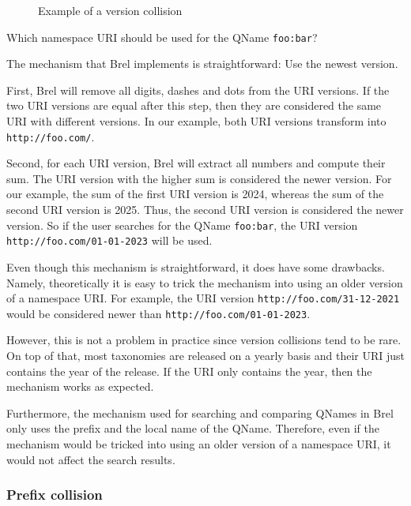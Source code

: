 \begin{figure}[H]
    \caption{Example of a version collision}
    \label{fig:version_collision_example}
\end{figure}

Which namespace URI should be used for the QName \texttt{foo:bar}?

The mechanism that Brel implements is straightforward: Use the newest version.

First, Brel will remove all digits, dashes and dots from the URI versions. 
If the two URI versions are equal after this step, then they are considered the same URI with different versions.
In our example, both URI versions transform into \texttt{http://foo.com/}.

Second, for each URI version, Brel will extract all numbers and compute their sum. The URI version with the higher sum is considered the newer version.
For our example, the sum of the first URI version is 2024, whereas the sum of the second URI version is 2025. 
Thus, the second URI version is considered the newer version. 
So if the user searches for the QName \texttt{foo:bar}, the URI version \texttt{http://foo.com/01-01-2023} will be used.

Even though this mechanism is straightforward, it does have some drawbacks. 
Namely, theoretically it is easy to trick the mechanism into using an older version of a namespace URI.
For example, the URI version \texttt{http://foo.com/31-12-2021} would be considered newer than \texttt{http://foo.com/01-01-2023}.

However, this is not a problem in practice since version collisions tend to be rare.
On top of that, most taxonomies are released on a yearly basis and their URI just contains the year of the release.
If the URI only contains the year, then the mechanism works as expected.

Furthermore, the mechanism used for searching and comparing QNames in Brel only uses the prefix and the local name of the QName.
Therefore, even if the mechanism would be tricked into using an older version of a namespace URI, it would not affect the search results.

\subsubsection{Prefix collision}

